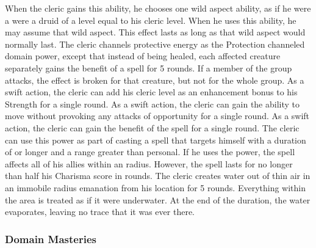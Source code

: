  When the cleric gains this ability, he chooses one wild aspect ability, as if he were a were a druid of a level equal to his cleric level. When he uses this ability, he may assume that wild aspect. This effect lasts as long as that wild aspect would normally last.
 The cleric channels protective energy as the Protection channeled domain power, except that instead of being healed, each affected creature separately gains the benefit of a  spell for 5 rounds.  If a member of the group attacks, the effect is broken for that creature, but not for the whole group.
 As a swift action, the cleric can add his cleric level as an enhancement bonus to his Strength for a single round.
 As a swift action, the cleric can gain the ability to move without provoking any attacks of opportunity for a single round.
 As a swift action, the cleric can gain the benefit of the  spell for a single round.
 The cleric can use this power as part of casting a spell that targets himself with a duration of \durshort or longer and a range greater than personal. If he uses the power, the spell affects all of his allies within an \areamed radius. However, the spell lasts for no longer than half his Charisma score in rounds.
 The cleric creates water out of thin air in an immobile \areamed radius emanation from his location for 5 rounds. Everything within the area is treated as if it were underwater. At the end of the duration, the water evaporates, leaving no trace that it was ever there.

\subsubsection{Domain Masteries}\label{Domain Masteries}

